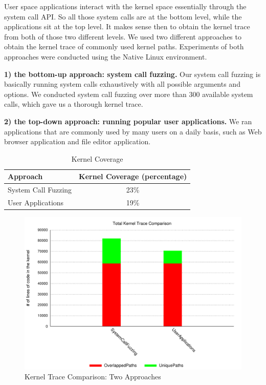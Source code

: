 User space applications interact with the kernel space essentially through the system call API. 
So all those system calls are at the bottom level, while the applications sit at the top level. 
It makes sense then to obtain the kernel trace from both of those two different levels. 
We used two different approaches to obtain the kernel trace of commonly used kernel paths. 
Experiments of both approaches were conducted using the Native Linux environment.

\textbf{1) the bottom-up approach: system call fuzzing.}
Our system call fuzzing is basically running system calls exhaustively with all possible 
arguments and options. We conducted system call fuzzing over more than 300 available system calls, 
which gave us a thorough kernel trace. 

\textbf{2) the top-down approach: running popular user applications.} 
We ran applications that are commonly used by many users on a daily basis, such as Web browser application
and file editor application.  

\begin{table}[ht]
\centering
\begin{tabular}{|l|c|}
  \hline
  Approach & Kernel Coverage (percentage) \\
  \hline \hline
  System Call Fuzzing & 23\% \\
  \hline
  User Applications & 19\% \\
  \hline
\end{tabular}
\caption {Kernel Coverage}
\label{table:kernel_coverage}
\end{table}

\begin{figure}[h]
\centering
\includegraphics[width=1.0\columnwidth]{diagram/lind_ccs15_diagram_01.pdf}
\caption{Kernel Trace Comparison: Two Approaches}
\label{fig:two_approaches_trace}
\end{figure}


